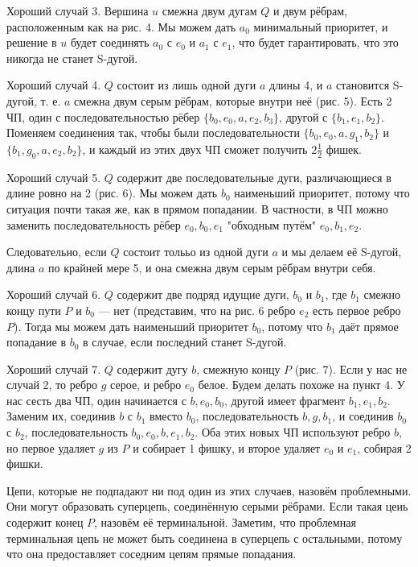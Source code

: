 \begin{proofstar}
Хороший случай 3. 
Вершина $u$ смежна двум дугам $Q$ и двум рёбрам, расположенным как на рис. 4. Мы можем дать $a_0$ минимальный приоритет, и решение в $u$ будет соединять $a_0$ с $e_0$ и $a_1$ с $e_1$, что будет гарантировать, что это никогда не станет S-дугой.

Хороший случай 4.
$Q$ состоит из лишь одной дуги $a$ длины 4, и $a$ становится S-дугой, т. е. $a$ смежна двум серым рёбрам, которые внутри неё (рис. 5). Есть 2 ЧП, один с последовательностью рёбер $\{b_0, e_0, a, e_2, b_3\}$, другой с $\{b_1, e_1, b_2\}$. Поменяем соединения так, чтобы были последовательности $\{b_0, e_0, a, g_1, b_2\}$ и $\{b_1, g_0, a, e_2, b_2\}$, и каждый из этих двух ЧП сможет получить $2\frac{1}{2}$ фишек.

Хороший случай 5. $Q$ содержит две последовательные дуги, различающиеся в длине ровно на 2 (рис. 6). Мы можем дать $b_0$ наименьший приоритет, потому что ситуация почти такая же, как в прямом попадании. В частности, в ЧП можно заменить последовательность рёбер $e_0, b_0, e_1$ "обходным путём" $e_0, b_1, e_2$. 

Следовательно, если $Q$ состоит толььо из одной дуги $a$ и мы делаем её S-дугой, длина $a$ по крайней мере 5, и она смежна двум серым рёбрам внутри себя.

Хороший случай 6.
$Q$ содержит две подряд идущие дуги, $b_0$ и $b_1$, где $b_1$ смежно концу пути $P$ и $b_0$ --- нет (представим, что на рис. 6 ребро $e_2$ есть первое ребро $P$). Тогда мы можем дать наименьший приоритет $b_0$, потому что $b_1$ даёт прямое попадание в $b_0$ в случае, если последний станет S-дугой.

Хороший случай 7.
$Q$ содержит дугу $b$, смежную концу $P$ (рис. 7). Если у нас не случай 2, то ребро $g$ серое, и ребро $e_0$ белое. Будем делать похоже на пункт 4. У нас сесть два ЧП, один начинается с $b, e_0, b_0$, другой имеет фрагмент $b_1, e_1, b_2$. Заменим их, соединив $b$ с $b_1$ вместо $b_0$, последовательность $b, g, b_1$, и соединив $b_0$ с $b_2$, последовательность $b_0, e_0, b, e_1, b_2$. Оба этих новых ЧП используют ребро $b$, но первое удаляет $g$ из $P$ и собирает 1 фишку, и второе удаляет $e_0$ и $e_1$, собирая 2 фишки. 

Цепи, которые не подпадают ни под один из этих случаев, назовём проблемными. Они могут образовать суперцепь, соединённую серыми рёбрами. Если такая цеиь содержит конец $P$, назовём её терминальной. Заметим, что проблемная терминальная цепь не может быть соединена в суперцепь с остальными, потому что она предоставляет соседним цепям прямые попадания.


\end{proofstar}
